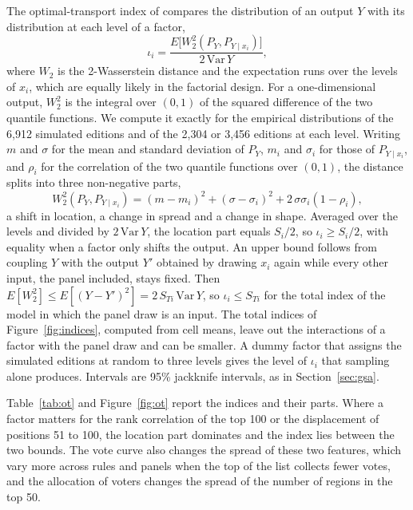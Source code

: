 \documentclass[11pt,a4paper]{article}
\begin{document}
The optimal-transport index of \citet{borgonovo2025ot} compares the distribution of an output $Y$ with its distribution at each level of a factor,
\[
\iota_i = \frac{E\bigl[W_2^2(P_Y, P_{Y \mid x_i})\bigr]}{2\,\mathrm{Var}\,Y},
\]
where $W_2$ is the 2-Wasserstein distance and the expectation runs over the levels of $x_i$, which are equally likely in the factorial design. For a one-dimensional output, $W_2^2$ is the integral over $(0,1)$ of the squared difference of the two quantile functions. We compute it exactly for the empirical distributions of the 6,912 simulated editions and of the 2,304 or 3,456 editions at each level. Writing $m$ and $\sigma$ for the mean and standard deviation of $P_Y$, $m_i$ and $\sigma_i$ for those of $P_{Y \mid x_i}$, and $\rho_i$ for the correlation of the two quantile functions over $(0,1)$, the distance splits into three non-negative parts,
\[
W_2^2(P_Y, P_{Y \mid x_i}) = (m - m_i)^2 + (\sigma - \sigma_i)^2 + 2\,\sigma \sigma_i (1 - \rho_i),
\]
a shift in location, a change in spread and a change in shape. Averaged over the levels and divided by $2\,\mathrm{Var}\,Y$, the location part equals $S_i/2$, so $\iota_i \geq S_i/2$, with equality when a factor only shifts the output. An upper bound follows from coupling $Y$ with the output $Y'$ obtained by drawing $x_i$ again while every other input, the panel included, stays fixed. Then $E[W_2^2] \leq E[(Y - Y')^2] = 2\,S_{Ti}\,\mathrm{Var}\,Y$, so $\iota_i \leq S_{Ti}$ for the total index of the model in which the panel draw is an input. The total indices of Figure~\ref{fig:indices}, computed from cell means, leave out the interactions of a factor with the panel draw and can be smaller. A dummy factor that assigns the simulated editions at random to three levels gives the level of $\iota_i$ that sampling alone produces. Intervals are 95\% jackknife intervals, as in Section~\ref{sec:gsa}.

Table~\ref{tab:ot} and Figure~\ref{fig:ot} report the indices and their parts. Where a factor matters for the rank correlation of the top 100 or the displacement of positions 51 to 100, the location part dominates and the index lies between the two bounds. The vote curve also changes the spread of these two features, which vary more across rules and panels when the top of the list collects fewer votes, and the allocation of voters changes the spread of the number of regions in the top 50.
\end{document}
